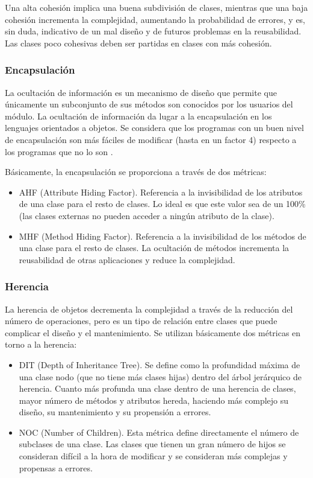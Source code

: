 \documentclass[11pt]{article}
\begin{document}
Una alta cohesión implica una buena subdivisión de clases, mientras que una baja cohesión incrementa la complejidad, aumentando la probabilidad de errores, y es, sin duda, indicativo de un mal diseño y de futuros problemas en la reusabilidad. Las clases poco cohesivas deben ser partidas en clases con más cohesión.

\subsubsection{Encapsulación}
La ocultación de información es un mecanismo de diseño que permite que únicamente un subconjunto de sus métodos son conocidos por los usuarios del módulo. La ocultación de información da lugar a la encapsulación en los lenguajes orientados a objetos. Se considera que los programas con un buen nivel de encapsulación son más fáciles de modificar (hasta en un factor 4) respecto a los programas que no lo son \cite{improving:softwareproductivity}.

Básicamente, la encapsulación se proporciona a través de dos métricas:

\begin{itemize}
\item{AHF (Attribute Hiding Factor)}. Referencia a la invisibilidad de los atributos de una clase para el resto de clases. Lo ideal es que este valor sea de un 100\% (las clases externas no pueden acceder a ningún atributo de la clase).
\item{MHF (Method Hiding Factor)}. Referencia a la invisibilidad de los métodos de una clase para el resto de clases. La ocultación de métodos incrementa la reusabilidad de otras aplicaciones y reduce la complejidad.
\end{itemize}

\subsubsection{Herencia}
La herencia de objetos decrementa la complejidad a través de la reducción del número de operaciones, pero es un tipo de relación entre clases que puede complicar el diseño y el mantenimiento. Se utilizan básicamente dos métricas en torno a la herencia:

\begin{itemize}
\item{DIT (Depth of Inheritance Tree)}. Se define como la profundidad máxima de una clase nodo (que no tiene más clases hijas) dentro del árbol jerárquico de herencia. Cuanto más profunda una clase dentro de una herencia de clases, mayor número de métodos y atributos hereda, haciendo más complejo su diseño, su mantenimiento y su propensión a errores. 
\item{NOC (Number of Children)}. Esta métrica define directamente el número de subclases de una clase. Las clases que tienen un gran número de hijos se consideran difícil a la hora de modificar y se consideran más complejas y propensas a errores.
\end{itemize}
\end{document}
